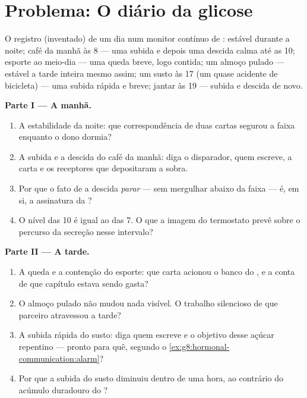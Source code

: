 \section{Problema: O diário da glicose}

\begin{problem}\label{pb:g8:hormonal-communication:1}
O registro (inventado) de um dia num monitor contínuo de :
estável durante a noite; café da manhã às 8 --- uma subida e depois uma
descida calma até as 10; esporte ao meio-dia --- uma queda breve, logo
contida; um almoço pulado --- estável a tarde inteira mesmo assim; um
susto às 17 (um quase acidente de bicicleta) --- uma subida rápida e
breve; jantar às 19 --- subida e descida de novo.

\medskip\noindent\textbf{Parte I --- A manhã.}
\begin{enumerate}
  \item A estabilidade da noite: que correspondência de duas cartas
        segurou a faixa enquanto o dono dormia?
  \item A subida e a descida do café da manhã: diga o disparador,
        quem escreve, a carta e os receptores que depositaram a sobra.
  \item Por que o fato de a descida \emph{parar} --- sem mergulhar
        abaixo da faixa --- é, em si, a assinatura da
        ?
  \item O nível das 10 é igual ao das 7. O que a imagem do termostato
        prevê sobre o percurso da secreção nesse intervalo?
\end{enumerate}

\medskip\noindent\textbf{Parte II --- A tarde.}
\begin{enumerate}[resume]
  \item A queda e a contenção do esporte: que carta acionou o banco
        do , e a conta de que capítulo estava sendo gasta?
  \item O almoço pulado não mudou nada visível. O trabalho silencioso
        de que  parceiro atravessou a tarde?
  \item A subida rápida do susto: diga quem escreve e o objetivo desse
        açúcar repentino --- pronto para quê, segundo o
        \cref{ex:g8:hormonal-communication:alarm}?
  \item Por que a subida do susto diminuiu dentro de uma hora, ao
        contrário do acúmulo duradouro do ?
\end{enumerate}


\end{problem}
